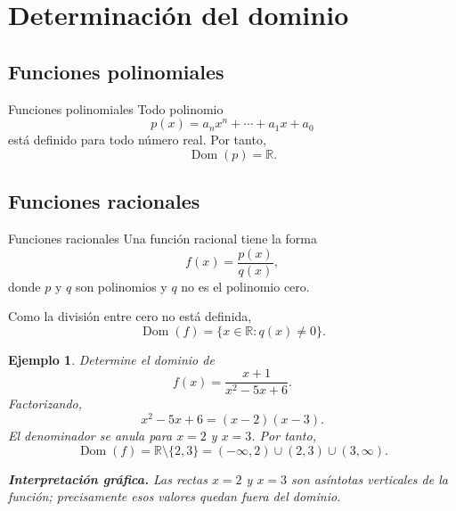 \documentclass[aspectratio=169,10pt]{beamer}
\newtheorem{ejemplo}{Ejemplo}
\newcommand{\R}{\mathbb{R}}
\newcommand{\Dom}{\operatorname{Dom}}
\begin{document}
\section{Determinación del dominio}
\subsection*{Funciones polinomiales}
\begin{frame}{Funciones polinomiales}
Todo polinomio
\[
p(x)=a_nx^n+\cdots+a_1x+a_0
\]
está definido para todo número real. Por tanto,
\[
\Dom(p)=\R.
\]
\end{frame}
\subsection*{Funciones racionales}
\begin{frame}{Funciones racionales}
Una función racional tiene la forma
\[
f(x)=\frac{p(x)}{q(x)},
\]
donde $p$ y $q$ son polinomios y $q$ no es el polinomio cero.

Como la división entre cero no está definida,
\[
\Dom(f)=\{x\in\R:q(x)\neq0\}.
\]

\begin{ejemplo}
Determine el dominio de
\[
f(x)=\frac{x+1}{x^2-5x+6}.
\]
Factorizando,
\[
x^2-5x+6=(x-2)(x-3).
\]
El denominador se anula para $x=2$ y $x=3$. Por tanto,
\[
\Dom(f)=\R\setminus\{2,3\}
=(-\infty,2)\cup(2,3)\cup(3,\infty).
\]

\textbf{Interpretación gráfica.} Las rectas $x=2$ y $x=3$ son asíntotas
verticales de la función; precisamente esos valores quedan fuera del dominio.
\begin{center}
\end{center}
\end{ejemplo}
\end{frame}
\end{document}
